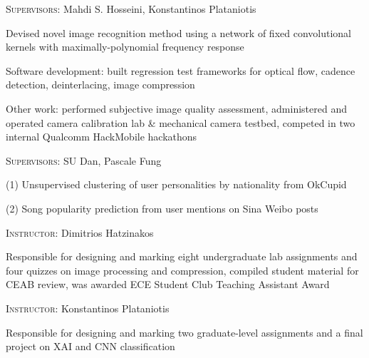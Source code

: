 \documentclass[12pt]{cv_style}
\begin{document}
%
\textsc{Supervisors:} Mahdi S. Hosseini, Konstantinos Plataniotis
\begin{ditem}
	\item Devised novel image recognition method using a network of fixed convolutional kernels with maximally-polynomial frequency response
\end{ditem}
%
\begin{ditem}
	\item Software development: built regression test frameworks for optical flow, cadence detection, deinterlacing, image compression
	\item Other work: performed subjective image quality assessment, administered and operated camera calibration lab \& mechanical camera testbed, competed in two internal Qualcomm HackMobile hackathons
\end{ditem}
%
\textsc{Supervisors:} SU Dan, Pascale Fung
\begin{ditem}
	\item (1) Unsupervised clustering of user personalities by nationality from OkCupid
	\item (2) Song popularity prediction from user mentions on Sina Weibo posts
\end{ditem}
%

\textsc{Instructor:} Dimitrios Hatzinakos\\
\begin{ditem}
	\item Responsible for designing and marking eight undergraduate lab assignments and four quizzes on image processing and compression, compiled student material for CEAB review, was awarded ECE Student Club Teaching Assistant Award
\end{ditem}
\textsc{Instructor:} Konstantinos Plataniotis\\
\begin{ditem}
	\item Responsible for designing and marking two graduate-level assignments and a final project on XAI and CNN classification
\end{ditem}

%
\end{document}
